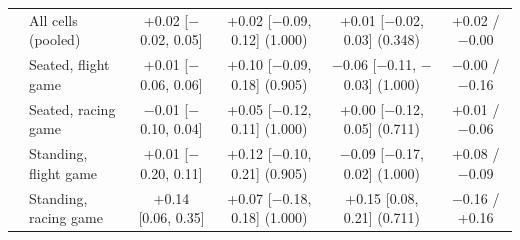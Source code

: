 \begin{table}[ht]
\begin{tabular}{@{}llcccc@{}}
 & All cells (pooled) & +0.02 [$-$0.02, 0.05] & +0.02 [$-$0.09, 0.12] (1.000) & +0.01 [$-$0.02, 0.03] (0.348) & +0.02 / $-$0.00 \\
 & Seated, flight game & +0.01 [$-$0.06, 0.06] & +0.10 [$-$0.09, 0.18] (0.905) & $-$0.06 [$-$0.11, $-$0.03] (1.000) & $-$0.00 / $-$0.16 \\
 & Seated, racing game & $-$0.01 [$-$0.10, 0.04] & +0.05 [$-$0.12, 0.11] (1.000) & +0.00 [$-$0.12, 0.05] (0.711) & +0.01 / $-$0.06 \\
 & Standing, flight game & +0.01 [$-$0.20, 0.11] & +0.12 [$-$0.10, 0.21] (0.905) & $-$0.09 [$-$0.17, 0.02] (1.000) & +0.08 / $-$0.09 \\
 & Standing, racing game & +0.14 [0.06, 0.35] & +0.07 [$-$0.18, 0.18] (1.000) & +0.15 [0.08, 0.21] (0.711) & $-$0.16 / +0.16 \\
\bottomrule
\end{tabular}
\end{table}